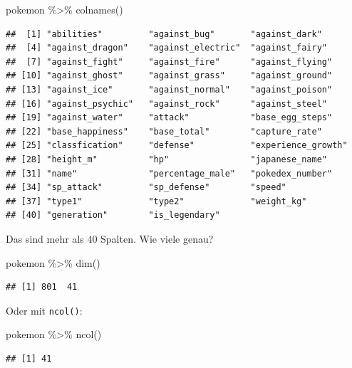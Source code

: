 \documentclass[
]{book}
\newenvironment{Shaded}{\begin{snugshade}}{\end{snugshade}}
\newcommand{\FunctionTok}[1]{\textcolor[rgb]{0.00,0.00,0.00}{#1}}
\newcommand{\NormalTok}[1]{#1}
\newcommand{\SpecialCharTok}[1]{\textcolor[rgb]{0.00,0.00,0.00}{#1}}
\begin{document}
\begin{Shaded}
\begin{Highlighting}[]
\NormalTok{pokemon }\SpecialCharTok{\%\textgreater{}\%} \FunctionTok{colnames}\NormalTok{()}
\end{Highlighting}
\end{Shaded}

\begin{verbatim}
##  [1] "abilities"         "against_bug"       "against_dark"     
##  [4] "against_dragon"    "against_electric"  "against_fairy"    
##  [7] "against_fight"     "against_fire"      "against_flying"   
## [10] "against_ghost"     "against_grass"     "against_ground"   
## [13] "against_ice"       "against_normal"    "against_poison"   
## [16] "against_psychic"   "against_rock"      "against_steel"    
## [19] "against_water"     "attack"            "base_egg_steps"   
## [22] "base_happiness"    "base_total"        "capture_rate"     
## [25] "classfication"     "defense"           "experience_growth"
## [28] "height_m"          "hp"                "japanese_name"    
## [31] "name"              "percentage_male"   "pokedex_number"   
## [34] "sp_attack"         "sp_defense"        "speed"            
## [37] "type1"             "type2"             "weight_kg"        
## [40] "generation"        "is_legendary"
\end{verbatim}

Das sind mehr als 40 Spalten. Wie viele genau?

\begin{Shaded}
\begin{Highlighting}[]
\NormalTok{pokemon }\SpecialCharTok{\%\textgreater{}\%} \FunctionTok{dim}\NormalTok{()}
\end{Highlighting}
\end{Shaded}

\begin{verbatim}
## [1] 801  41
\end{verbatim}

Oder mit \texttt{ncol()}:

\begin{Shaded}
\begin{Highlighting}[]
\NormalTok{pokemon }\SpecialCharTok{\%\textgreater{}\%} \FunctionTok{ncol}\NormalTok{()}
\end{Highlighting}
\end{Shaded}

\begin{verbatim}
## [1] 41
\end{verbatim}
\end{document}
